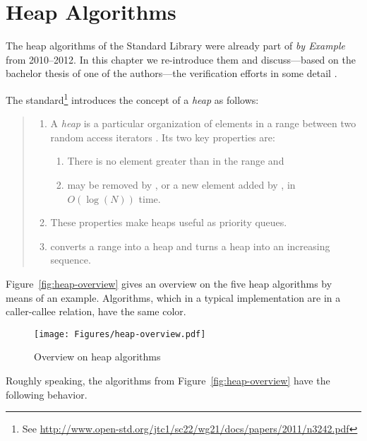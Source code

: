 \chapter{Heap Algorithms}

The heap algorithms of the \cxx Standard 
Library \cite[28.7.7]{cxx-17-draft}
were already part of \emph{\acsl by Example} from 2010--2012.
In this chapter we re-introduce them and discuss---based on the
bachelor thesis of one of the authors---the verification efforts in some 
detail \cite{Lapawczyk_2016_bachelor}.


The \cxx standard\footnote{
  See \url{http://www.open-std.org/jtc1/sc22/wg21/docs/papers/2011/n3242.pdf}
} introduces the concept of a \emph{heap} as follows:

\begin{small}
\begin{quote}
\begin{enumerate}
\item A \emph{heap} is a particular organization of elements in a range between two
random access iterators \inl{[a,b)}. Its two key properties are:
\begin{enumerate}
\item There is no element greater than  in the range and
\item {} may be removed by , or a new element added by , in
       $O(\log(N))$ time.
\end{enumerate}
\item These properties make heaps useful as priority queues.
\item {} converts a range into a heap and 
      turns a heap into an increasing sequence.
\end{enumerate}
\end{quote}
\end{small}


Figure~\ref{fig:heap-overview} gives an overview on the five heap algorithms
by means of an example.
Algorithms, which in a typical implementation are in a caller-callee relation, have the same color.

\begin{figure}[hbt]
\centering
\texttt{[image: Figures/heap-overview.pdf]}
\caption{Overview on heap algorithms}
\end{figure}

\clearpage

Roughly speaking, the algorithms from Figure~\ref{fig:heap-overview} have
the following behavior.

